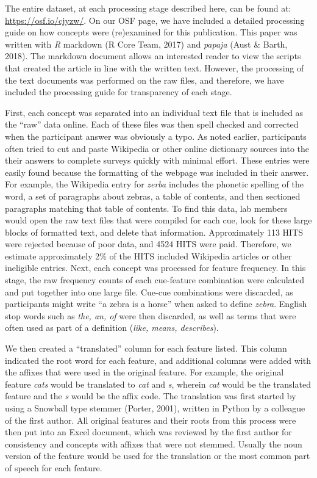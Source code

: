 \documentclass[english,,man]{apa6}
\theoremstyle{definition}
\theoremstyle{definition}
\theoremstyle{definition}
\theoremstyle{remark}
\begin{document}
The entire dataset, at each processing stage described here, can be
found at: \url{https://osf.io/cjyzw/}. On our OSF page, we have included
a detailed processing guide on how concepts were (re)examined for this
publication. This paper was written with \emph{R} markdown (R Core Team,
2017) and \emph{papaja} (Aust \& Barth, 2018). The markdown document
allows an interested reader to view the scripts that created the article
in line with the written text. However, the processing of the text
documents was performed on the raw files, and therefore, we have
included the processing guide for transparency of each stage.

First, each concept was separated into an individual text file that is
included as the \enquote{raw} data online. Each of these files was then
spell checked and corrected when the participant answer was obviously a
typo. As noted earlier, participants often tried to cut and paste
Wikipedia or other online dictionary sources into the their answers to
complete surveys quickly with minimal effort. These entries were easily
found because the formatting of the webpage was included in their
answer. For example, the Wikipedia entry for \emph{zerba} includes the
phonetic spelling of the word, a set of paragraphs about zebras, a table
of contents, and then sectioned paragraphs matching that table of
contents. To find this data, lab members would open the raw text files
that were compiled for each cue, look for these large blocks of
formatted text, and delete that information. Approximately 113 HITS were
rejected because of poor data, and 4524 HITS were paid. Therefore, we
estimate approximately 2\% of the HITS included Wikipedia articles or
other ineligible entries. Next, each concept was processed for feature
frequency. In this stage, the raw frequency counts of each cue-feature
combination were calculated and put together into one large file.
Cue-cue combinations were discarded, as participants might write
\enquote{a zebra is a horse} when asked to define \emph{zebra}. English
stop words such as \emph{the, an, of} were then discarded, as well as
terms that were often used as part of a definition (\emph{like, means,
describes}).

We then created a \enquote{translated} column for each feature listed.
This column indicated the root word for each feature, and additional
columns were added with the affixes that were used in the original
feature. For example, the original feature \emph{cats} would be
translated to \emph{cat} and \emph{s}, wherein \emph{cat} would be the
translated feature and the \emph{s} would be the affix code. The
translation was first started by using a Snowball type stemmer (Porter,
2001), written in Python by a colleague of the first author. All
original features and their roots from this process were then put into
an Excel document, which was reviewed by the first author for
consistency and concepts with affixes that were not stemmed. Usually the
noun version of the feature would be used for the translation or the
most common part of speech for each feature.
\end{document}
